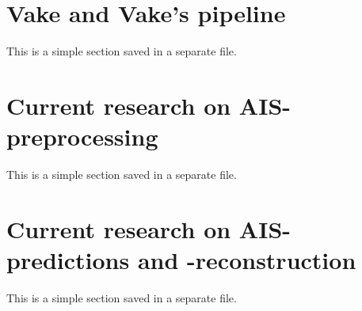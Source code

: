 
\section{Vake and Vake's pipeline}
\begin{info}{}
	This is a simple section saved in a separate file.
\end{info}





\section{Current research on AIS-preprocessing}
\begin{info}{}
	This is a simple section saved in a separate file.
\end{info}





\section{Current research on AIS-predictions and -reconstruction}
\begin{info}{}
	This is a simple section saved in a separate file.
\end{info}







